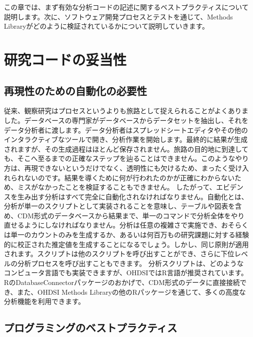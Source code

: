 \documentclass[
  11pt]{book}
\theoremstyle{definition}
\theoremstyle{definition}
\theoremstyle{definition}
\theoremstyle{definition}
\theoremstyle{remark}
\begin{document}
この章では、まず有効な分析コードの記述に関するベストプラクティスについて説明します。次に、ソフトウェア開発プロセスとテストを通じて、Methods Libraryがどのように検証されているかについて説明していきます。

\section{研究コードの妥当性}\label{ux7814ux7a76ux30b3ux30fcux30c9ux306eux59a5ux5f53ux6027}

\subsection{再現性のための自動化の必要性}\label{automation}

従来、観察研究はプロセスというよりも旅路として捉えられることがよくありました。データベースの専門家がデータベースからデータセットを抽出し、それをデータ分析者に渡します。データ分析者はスプレッドシートエディタやその他のインタラクティブなツールで開き、分析作業を開始します。最終的に結果が生成されますが、その生成過程はほとんど保存されません。旅路の目的地に到達しても、そこへ至るまでの正確なステップを辿ることはできません。このようなやり方は、再現できないというだけでなく、透明性にも欠けるため、まったく受け入れられないのです。結果を導くために何が行われたのかが正確にわからないため、ミスがなかったことを検証することもできません。 したがって、エビデンスを生み出す分析はすべて完全に自動化されなければなりません。自動化とは、分析が単一のスクリプトとして実装されることを意味し、テーブルや図表を含め、CDM形式のデータベースから結果まで、単一のコマンドで分析全体をやり直せるようにしなければなりません。分析は任意の複雑さで実施でき、おそらくは単一のカウントのみを生成するか、あるいは何百万もの研究課題に対する経験的に校正された推定値を生成することになるでしょう。しかし、同じ原則が適用されます。スクリプトは他のスクリプトを呼び出すことができ、さらに下位レベルの分析プロセスを呼び出すこともできます。 分析スクリプトは、どのようなコンピュータ言語でも実装できますが、OHDSIではR言語が推奨されています。RのDatabaseConnectorパッケージのおかげで、CDM形式のデータに直接接続でき、また、OHDSI Methods Libraryの他のRパッケージを通じて、多くの高度な分析機能を利用できます。

\subsection{プログラミングのベストプラクティス}\label{ux30d7ux30edux30b0ux30e9ux30dfux30f3ux30b0ux306eux30d9ux30b9ux30c8ux30d7ux30e9ux30afux30c6ux30a3ux30b9}
\end{document}
